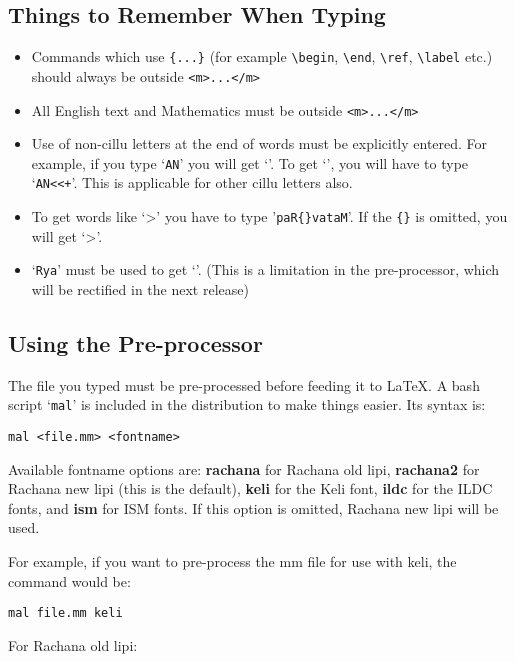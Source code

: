 \documentclass[12pt]{article}
\begin{document}
{\subsection{Things to Remember When Typing}

\begin{itemize}
\item Commands which use \verb"{...}" (for example
\verb"\begin", \verb"\end", \verb"\ref", \verb"\label" etc.)
should always be outside {\tt <m{}>...</m{}>}
\item All English text and Mathematics must be outside
{\tt <m{}>...</m{}>}
\item Use of non-cillu letters at the end of words must
be explicitly entered. For example, if you type `{\tt AN}'
you will get `{\mm \-\-}'. To get `{\mm \-\-}', you will
have to type `\verb"AN<<+"'. This is applicable for
other cillu letters also.
\item To get words like `{\mm \-\-\-\->}' you have to
type '\verb"paR{}vataM"'. If the \verb"{}" is omitted,
you will get `{\mm \-\-\->}'.
\item `{\tt Rya}' must be used to get `{\mm \-}'. (This
is a limitation in the pre-processor, which will be
rectified in the next release)
\end{itemize}

\subsection{Using the Pre-processor}
\label{sec:preprocess}

The file you typed must be pre-processed before feeding it
to \LaTeX. A bash script `{\tt mal}' is included in the
distribution to make things easier. Its syntax is:

\noindent \verb"mal <file.mm> <fontname>"

Available fontname options are: \textbf{rachana} for Rachana
old lipi, \textbf{rachana2} for Rachana new lipi (this is the
default), \textbf{keli} for the Keli font, \textbf{ildc} for the ILDC fonts, 
and \textbf{ism} for ISM fonts. If this option is omitted,
Rachana new lipi will be used.

For example, if you want to pre-process the mm file
for use with keli, the command would be:

\noindent \verb"mal file.mm keli"

For Rachana old lipi:

}
\end{document}
